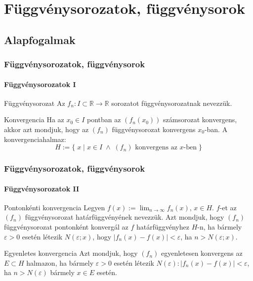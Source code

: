 \section{Függvénysorozatok, függvénysorok}

\subsection{Alapfogalmak}

\begin{frame}
  \frametitle{Függvénysorozatok, függvénysorok}
  \framesubtitle{Függvénysorozatok I}

  \begin{block}{Függvénysorozat}
    Az $f_n : I \subset \mathbb R \rightarrow \mathbb R$ sorozatot
    függvénysorozatnak nevezzük.
  \end{block}

  \begin{block}{Konvergencia}
    Ha az $x_0 \in I$ pontban az $(f_n(x_0))$ számsorozat konvergens, akkor azt
    mondjuk, hogy az $(f_n)$ függvénysorozat konvergens $x_0$-ban. A
    konvergencia\-halmaz:
    \[
      H := \Big\{\;
      x \;|\; x \in I \;\land\; (f_n) \text{ konvergens az } x \text{-ben}
      \;\Big\}
    \]
  \end{block}
\end{frame}

\begin{frame}
  \frametitle{Függvénysorozatok, függvénysorok}
  \framesubtitle{Függvénysorozatok II}

  \begin{block}{Pontonkénti konvergencia}
    Legyen $f(x) := \displaystyle\lim_{n \rightarrow \infty} f_n(x)$, $x \in H$.
    $f$-et az $(f_n)$ függvénysorozat határfüggvényének nevezzük. Azt mondjuk,
    hogy $(f_n)$ függvénysorozat pontonként konvergál az $f$ határfüggvényhez
    $H$-n, ha bármely $\varepsilon > 0$ esetén létezik $N(\varepsilon; x)$, hogy
    $|f_n(x) − f(x)| < \varepsilon$, ha $n > N(\varepsilon; x)$.
  \end{block}

  \begin{block}{Egyenletes konvergencia}
    Azt mondjuk, hogy $(f_n)$ egyenletesen konvergens az $E \subset H$ halmazon,
    ha bármely $\varepsilon > 0$ esetén létezik $N(\varepsilon): |f_n(x) − f(x)|
      < \varepsilon$, ha $n > N(\varepsilon)$ bármely $x \in E$ esetén.
  \end{block}
\end{frame}


